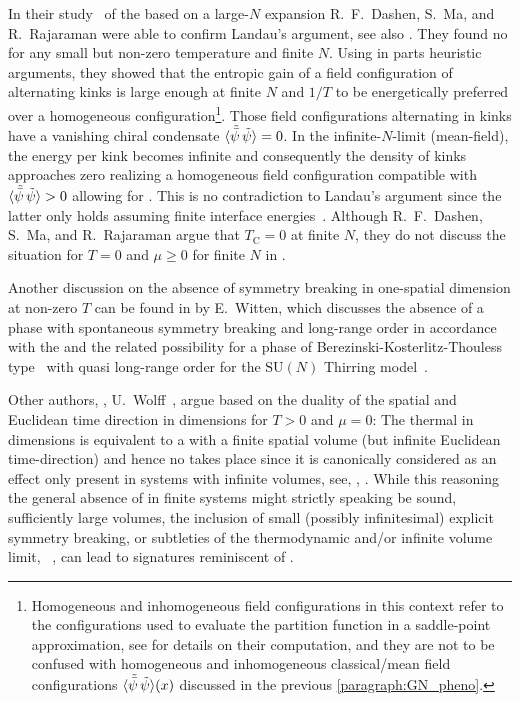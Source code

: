  In their study~\cite{Dashen:1974xz} of the \gnm{} based on a large-$N$ expansion R.~F.~Dashen, S.~Ma, and R.~Rajaraman were able to confirm Landau's argument, see also . They found no \ssb{} for any small but non-zero temperature and finite $N$. Using in parts heuristic arguments, they showed that the entropic gain of a field configuration of alternating kinks is large enough at finite $N$ and $1/T$ to be energetically preferred over a homogeneous configuration\footnote{Homogeneous and inhomogeneous field configurations in this context refer to the configurations used to evaluate the partition function in a saddle-point approximation, see  for details on their computation, and they are not to be confused with homogeneous and inhomogeneous classical/mean field configurations $\langle \tilde{\bar{\psi}}\,\tilde{\psi} \rangle(x)$ discussed in the previous \cref{paragraph:GN_pheno}.}. Those field configurations alternating in kinks have a vanishing chiral condensate $\langle \tilde{\bar{\psi}}\,\tilde{\psi}  \rangle = 0$. In the infinite-$N$-limit (mean-field), the energy per kink becomes infinite and consequently the density of kinks approaches zero realizing a homogeneous field configuration compatible with $\langle  \tilde{\bar{\psi}}\,\tilde{\psi}  \rangle > 0$ allowing for \ssb{}. This is no contradiction to Landau's argument since the latter only holds assuming finite interface energies~\cite{Landau:1980mil,Theodorakopoulos:2006}. Although R.~F.~Dashen, S.~Ma, and R.~Rajaraman argue that $T_\mathrm{C} = 0$ at finite $N$, they do not discuss the situation for $T = 0$ and $\mu \geq 0$ for finite $N$ in .

Another discussion on the absence of symmetry breaking in one-spatial dimension at non-zero $T$ can be found in  by E.~Witten, which discusses the absence of a phase with spontaneous symmetry breaking and long-range order in accordance with the \cmwhTheoremWithRefs{} and the related possibility for a phase of Berezinski-Kosterlitz-Thouless type~\cite{Berezinsky:1970fr,Kosterlitz:1973xp} with quasi long-range order for the $\mathrm{SU}(N)$ Thirring model~\cite{Thirring:1958in,Witten:1978qu}.

Other authors, \eg{}, U.~Wolff~\cite{Wolff:1985av}, argue based on the duality of the spatial and Euclidean time direction in  dimensions for $T>0$ and $\mu=0$: The thermal \gnm{} in  dimensions is equivalent to a \qft{} with a finite spatial volume (but infinite Euclidean time-direction) and hence no \ssb{} takes place since it is canonically considered as an effect only present in systems with infinite volumes, see, \eg{}, . While this reasoning \dash{} the general absence of \ssb{} in finite systems \dash{} might strictly speaking be sound, sufficiently large volumes, the inclusion of small (possibly infinitesimal) explicit symmetry breaking, or subtleties of the thermodynamic and/or infinite volume limit, \cf{}\ , can lead to signatures reminiscent of \ssb{}.

